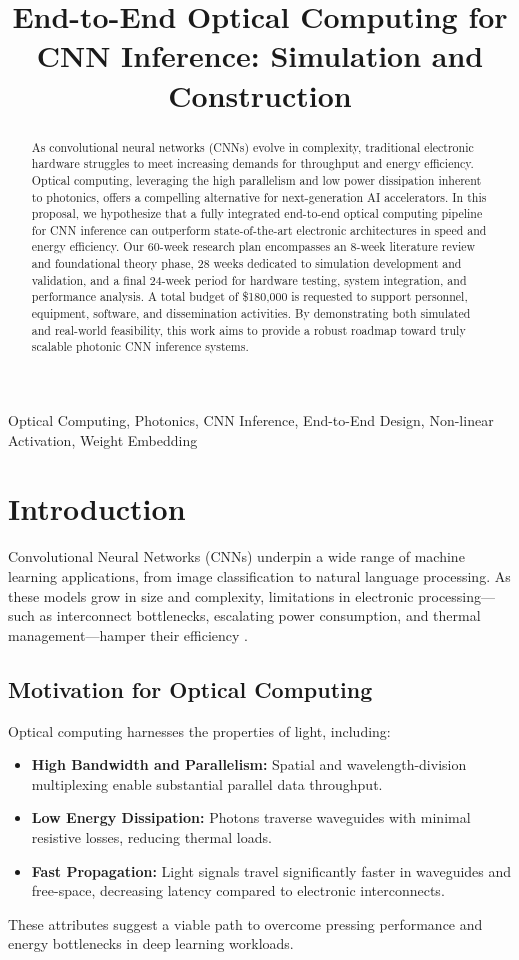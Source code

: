 \documentclass[conference]{IEEEtran}
\title{\textbf{End-to-End Optical Computing for CNN Inference: Simulation and Construction}}
\author{
  \IEEEauthorblockN{Santiago Sosa, Marc DeCarlo}
  \IEEEauthorblockA{Department of Electrical and Computer Engineering\\ 
  Drexel University\\
  Emails: \{ss5427, mad534\}@drexel.edu}
}
\begin{document}
\maketitle

\begin{abstract}
As convolutional neural networks (CNNs) evolve in complexity, traditional electronic hardware struggles to meet increasing demands for throughput and energy efficiency. Optical computing, leveraging the high parallelism and low power dissipation inherent to photonics, offers a compelling alternative for next-generation AI accelerators. In this proposal, we hypothesize that a fully integrated end-to-end optical computing pipeline for CNN inference can outperform state-of-the-art electronic architectures in speed and energy efficiency. Our 60-week research plan encompasses an 8-week literature review and foundational theory phase, 28 weeks dedicated to simulation development and validation, and a final 24-week period for hardware testing, system integration, and performance analysis. A total budget of \$180,000 is requested to support personnel, equipment, software, and dissemination activities. By demonstrating both simulated and real-world feasibility, this work aims to provide a robust roadmap toward truly scalable photonic CNN inference systems.
\end{abstract}

\begin{IEEEkeywords}
Optical Computing, Photonics, CNN Inference, End-to-End Design, Non-linear Activation, Weight Embedding
\end{IEEEkeywords}

\section{Introduction}
Convolutional Neural Networks (CNNs) underpin a wide range of machine learning applications, from image classification to natural language processing. As these models grow in size and complexity, limitations in electronic processing—such as interconnect bottlenecks, escalating power consumption, and thermal management—hamper their efficiency \cite{ref:jouppi2017datacenter}.

\subsection{Motivation for Optical Computing}
Optical computing harnesses the properties of light, including:
\begin{itemize}
    \item \textbf{High Bandwidth and Parallelism:} Spatial and wavelength-division multiplexing enable substantial parallel data throughput.
    \item \textbf{Low Energy Dissipation:} Photons traverse waveguides with minimal resistive losses, reducing thermal loads.
    \item \textbf{Fast Propagation:} Light signals travel significantly faster in waveguides and free-space, decreasing latency compared to electronic interconnects.
\end{itemize}
These attributes suggest a viable path to overcome pressing performance and energy bottlenecks in deep learning workloads.
\end{document}
